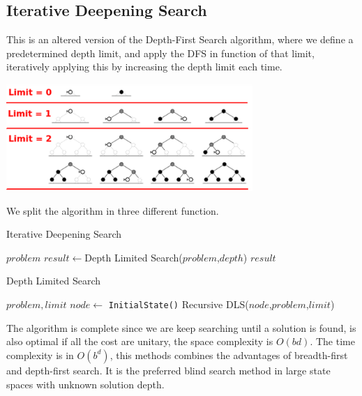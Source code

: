\documentclass[10pt, letterpaper]{report}
\begin{document}
\subsection{Iterative Deepening Search}
This is an altered version of the Depth-First Search algorithm, where we define a predetermined depth limit, and apply the DFS in function of that limit, iteratively applying this by increasing the depth limit each time.
\begin{center}
    \includegraphics[width=0.7\textwidth ]{images/iterative_deep.png}
\end{center}
We split the algorithm in three different function.

 \begin{algorithm}
    \caption{Iterative Deepening Search}\label{alg:IDS}
    \begin{algorithmic}
    \Require $problem$
    \State $result\leftarrow$Depth Limited Search($problem$,$depth$)
    \State\Return $result$
    \EndIf
    \EndFor
    \end{algorithmic}
\end{algorithm}

 \begin{algorithm}
    \caption{Depth Limited Search}\label{alg:DLS}
    \begin{algorithmic}
    \Require $problem,limit$
    \State $node\leftarrow$ \texttt{InitialState()}
    \State\Return Recursive DLS($node$,$problem$,$limit$)
    \end{algorithmic}
\end{algorithm}

The algorithm is complete since we are keep searching until a solution is found, is also optimal if all the cost are unitary, the space complexity is $O(bd)$. The time complexity is in $O(b^d)$, this methods combines the advantages of breadth-first and depth-first search. It is the preferred blind search method in large state spaces with unknown solution depth.\bigskip
\end{document}
